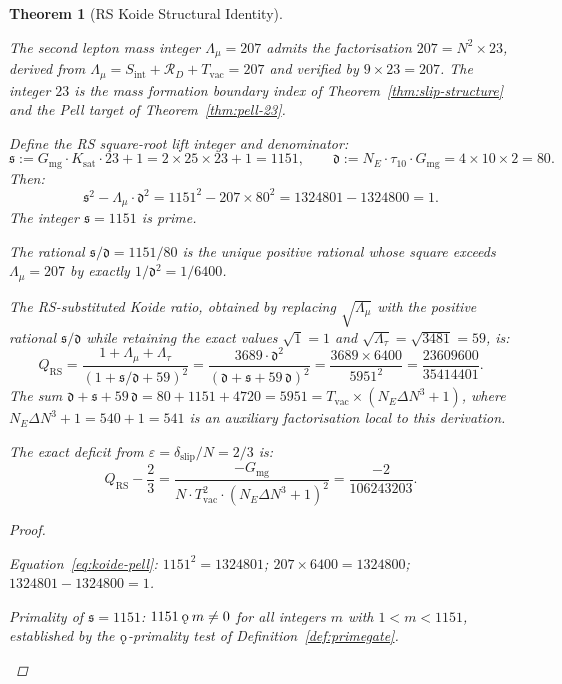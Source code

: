\documentclass[11pt, letterpaper]{article}
\newcommand{\koppa}{\mathbin{\text{\rm\k{o}}}}
\newcommand{\Sint}{S_{\mathrm{int}}}
\newcommand{\Gmg}{G_{\mathrm{mg}}}
\newcommand{\Ksat}{K_{\mathrm{sat}}}
\newcommand{\dslip}{\delta_{\mathrm{slip}}}
\newcommand{\Tvac}{T_{\mathrm{vac}}}
\theoremstyle{definition}
\theoremstyle{plain}
\newtheorem{theorem}{Theorem}[section]
\begin{document}
\begin{theorem}[RS Koide Structural Identity]
\label{thm:koide-structural}
\begin{rsbox}
The second lepton mass integer $\Lambda_\mu=207$ admits the factorisation
$207=N^2\times23$, derived from $\Lambda_\mu=\Sint+\mathcal{R}_D+\Tvac=207$
and verified by $9\times23=207$.  The integer $23$ is the mass formation
boundary index of Theorem~\ref{thm:slip-structure} and the Pell target of
Theorem~\ref{thm:pell-23}.

Define the RS square-root lift integer and denominator:
\[
\mathfrak{s} := \Gmg\cdot\Ksat\cdot23+1 = 2\times25\times23+1 = 1151,
\qquad
\mathfrak{d} := N_E\cdot\tau_{10}\cdot\Gmg = 4\times10\times2 = 80.
\]
Then:
\begin{equation}
\mathfrak{s}^2 - \Lambda_\mu\cdot\mathfrak{d}^2
= 1151^2 - 207\times80^2 = 1324801 - 1324800 = 1.
\label{eq:koide-pell}
\end{equation}
The integer $\mathfrak{s}=1151$ is prime.

The rational $\mathfrak{s}/\mathfrak{d}=1151/80$ is the unique positive
rational whose square exceeds $\Lambda_\mu=207$ by exactly
$1/\mathfrak{d}^2=1/6400$.

The RS-substituted Koide ratio, obtained by replacing $\sqrt{\Lambda_\mu}$
with the positive rational $\mathfrak{s}/\mathfrak{d}$ while retaining the
exact values $\sqrt{1}=1$ and $\sqrt{\Lambda_\tau}=\sqrt{3481}=59$, is:
\[
Q_{\mathrm{RS}}
= \frac{1+\Lambda_\mu+\Lambda_\tau}{(1+\mathfrak{s}/\mathfrak{d}+59)^2}
= \frac{3689\cdot\mathfrak{d}^2}{(\mathfrak{d}+\mathfrak{s}+59\,\mathfrak{d})^2}
= \frac{3689\times6400}{5951^2}
= \frac{23609600}{35414401}.
\]
The sum $\mathfrak{d}+\mathfrak{s}+59\,\mathfrak{d}=80+1151+4720=5951
=\Tvac\times(N_E\Delta N^3+1)$, where $N_E\Delta N^3+1=540+1=541$ is
an auxiliary factorisation local to this derivation.

The exact deficit from $\varepsilon=\dslip/N=2/3$ is:
\begin{equation}
Q_{\mathrm{RS}} - \frac{2}{3}
= \frac{-\Gmg}{N\cdot\Tvac^2\cdot(N_E\Delta N^3+1)^2}
= \frac{-2}{106243203}.
\label{eq:koide-deficit}
\end{equation}
\end{rsbox}
\begin{proof}
\begin{rsbox}
Equation~\eqref{eq:koide-pell}: $1151^2=1324801$;
$207\times6400=1324800$; $1324801-1324800=1$.

Primality of $\mathfrak{s}=1151$: $1151\koppa m\neq0$ for all integers
$m$ with $1<m<1151$, established by the $\koppa$-primality test of
Definition~\ref{def:primegate}.


\end{rsbox}
\end{proof}
\end{theorem}
\end{document}
